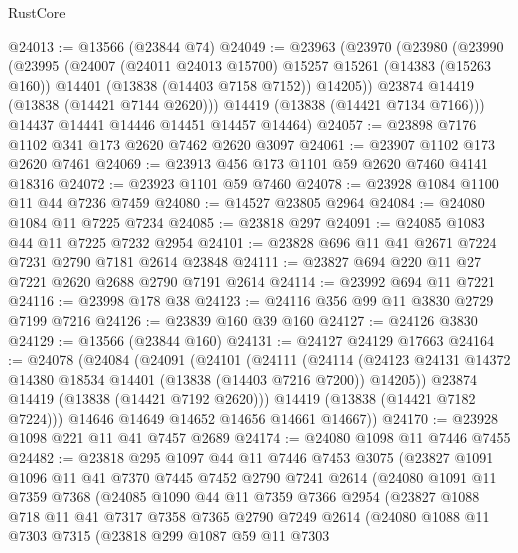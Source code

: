 \begin{lexlean}{RustCore}
\begin{coremodule}
@24013 := @13566 (@23844 @74)
@24049 := @23963
    (@23970
      (@23980
        (@23990
          (@23995
            (@24007
              (@24011 @24013 @15700)
              @15257
              @15261
              (@14383 (@15263 @160))
              @14401
              (@13838 (@14403 @7158 @7152))
              @14205))
          @23874
          @14419
          (@13838 (@14421 @7144 @2620)))
        @14419
        (@13838 (@14421 @7134 @7166)))
      @14437
      @14441
      @14446
      @14451
      @14457
      @14464)
@24057 := @23898 @7176 @1102 @341 @173 @2620 @7462 @2620 @3097
@24061 := @23907 @1102 @173 @2620 @7461
@24069 := @23913 @456 @173 @1101 @59 @2620 @7460 @4141 @18316
@24072 := @23923 @1101 @59 @7460
@24078 := @23928 @1084 @1100 @11 @44 @7236 @7459
@24080 := @14527 @23805 @2964
@24084 := @24080 @1084 @11 @7225 @7234
@24085 := @23818 @297
@24091 := @24085 @1083 @44 @11 @7225 @7232 @2954
@24101 := @23828 @696 @11 @41 @2671 @7224 @7231 @2790 @7181 @2614 @23848
@24111 := @23827 @694 @220 @11 @27 @7221 @2620 @2688 @2790 @7191 @2614
@24114 := @23992 @694 @11 @7221
@24116 := @23998 @178 @38
@24123 := @24116 @356 @99 @11 @3830 @2729 @7199 @7216
@24126 := @23839 @160 @39 @160
@24127 := @24126 @3830
@24129 := @13566 (@23844 @160)
@24131 := @24127 @24129 @17663
@24164 := @24078
    (@24084
      (@24091
        (@24101
          (@24111
            (@24114
              (@24123 @24131 @14372 @14380 @18534 @14401 (@13838 (@14403 @7216 @7200)) @14205))
            @23874
            @14419
            (@13838 (@14421 @7192 @2620)))
          @14419
          (@13838 (@14421 @7182 @7224)))
        @14646
        @14649
        @14652
        @14656
        @14661
        @14667))
@24170 := @23928 @1098 @221 @11 @41 @7457 @2689
@24174 := @24080 @1098 @11 @7446 @7455
@24482 := @23818
    @295
    @1097
    @44
    @11
    @7446
    @7453
    @3075
    (@23827
      @1091
      @1096
      @11
      @41
      @7370
      @7445
      @7452
      @2790
      @7241
      @2614
      (@24080
        @1091
        @11
        @7359
        @7368
        (@24085
          @1090
          @44
          @11
          @7359
          @7366
          @2954
          (@23827
            @1088
            @718
            @11
            @41
            @7317
            @7358
            @7365
            @2790
            @7249
            @2614
            (@24080
              @1088
              @11
              @7303
              @7315
              (@23818
                @299
                @1087
                @59
                @11
                @7303

\end{coremodule}
\end{lexlean}

